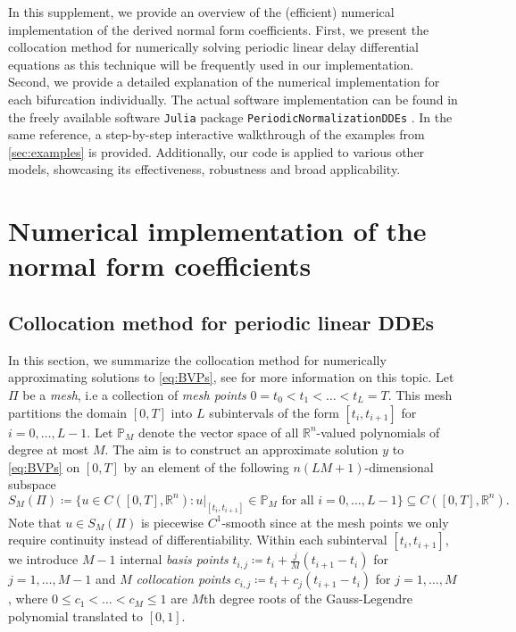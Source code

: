 \documentclass[english]{myarticle}
\begin{document}
\begin{sloppypar}
In this supplement, we provide an overview of the (efficient) numerical implementation of the derived normal form coefficients. First, we present the collocation method for numerically solving periodic linear delay differential equations as this technique will be frequently used in our implementation. Second, we provide a detailed explanation of the numerical implementation for each bifurcation individually. The actual software implementation can be found in the freely available software \verb|Julia| package \verb|PeriodicNormalizationDDEs| \cite{Bosschaert2024c}. In the same reference, a step-by-step interactive walkthrough of the examples from \cref{sec:examples} is provided. Additionally, our code is applied to various other models, showcasing its effectiveness, robustness and broad applicability.

\section{Numerical implementation of the normal form coefficients}
\subsection{Collocation method for periodic linear DDEs} \label{supp:collocationsubsec}
In this section, we summarize the collocation method for numerically approximating solutions to \eqref{eq:BVPs}, see \cite{Engelborghs2001,Engelborghs2002a} for more information on this topic. Let $\Pi$ be a \emph{mesh}, i.e a collection of \emph{mesh points} $0 = t_0 < t_1 < \dots < t_L = T$. This mesh partitions the domain $[0,T]$ into $L$ subintervals of the form $[t_i,t_{i+1}]$ for $i=0,\dots,L-1$. Let $\mathbb{P}_M$ denote the vector space of all $\mathbb{R}^n$-valued polynomials of degree at most $M$. The aim is to construct an approximate solution $y$ to \eqref{eq:BVPs} on $[0,T]$ by an element of the following $n(LM + 1)$-dimensional subspace
\begin{equation*}
    S_M(\Pi) \coloneqq \{ u \in C([0,T],\mathbb{R}^n) : u|_{[t_i,t_{i+1}]} \in \mathbb{P}_M \mbox{ for all } i=0,\dots,L-1 \} \subseteq C([0,T],\mathbb{R}^n).
\end{equation*}
Note that $u \in S_M(\Pi)$ is piecewise $C^1$-smooth since at the mesh points we only require continuity instead of differentiability. Within each subinterval $[t_i,t_{i+1}]$, we introduce $M-1$ internal \emph{basis points} $t_{i,j} \coloneqq t_i + \frac{j}{M}(t_{i+1}-t_i)$ for $j=1,\dots,M-1$ and $M$ \emph{collocation points} $c_{i,j} \coloneqq t_i + c_j(t_{i+1}-t_i)$ for $j=1,\dots,M$, where $0\leq c_1 < \dots < c_M \leq 1$ are $M$th degree roots of the Gauss-Legendre polynomial translated to $[0,1]$.


\end{sloppypar}
\end{document}
